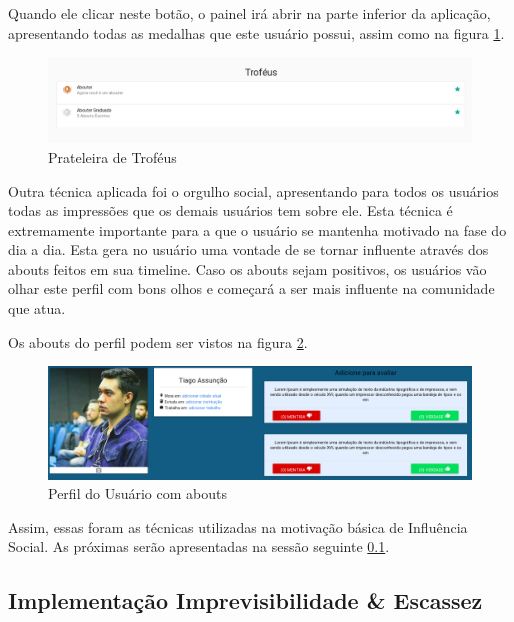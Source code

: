 Quando ele clicar neste botão, o painel irá abrir na parte inferior da aplicação, apresentando todas
as medalhas que este usuário possui, assim como na figura \ref{fig:show_trofeus}.

\begin{figure}[h]
    \centering
    \includegraphics[width=450px, scale=1]{figuras/show_trofeus}
    \caption{Prateleira de Troféus}
    \label{fig:show_trofeus}
\end{figure}

Outra técnica aplicada foi o orgulho social, apresentando para todos os usuários todas as impressões que os demais
usuários tem sobre ele. Esta técnica é extremamente importante para a que o usuário se mantenha motivado
na fase do dia a dia. Esta gera no usuário uma vontade de se tornar influente através dos abouts feitos em sua
timeline. Caso os abouts sejam positivos, os usuários vão olhar este perfil com bons olhos e começará
a ser mais influente na comunidade que atua.

Os abouts do perfil podem ser vistos na figura \ref{fig:show_profile}.

\begin{figure}[h]
    \centering
    \includegraphics[width=450px, scale=1]{figuras/show_profile}
    \caption{Perfil do Usuário com abouts}
    \label{fig:show_profile}
\end{figure}

Assim, essas foram as técnicas utilizadas na motivação básica de Influência Social. As próximas
serão apresentadas na sessão seguinte \ref{sub:implementacao_imprevisibilidade}.

\subsection{Implementação Imprevisibilidade \& Escassez}
\label{sub:implementacao_imprevisibilidade}

